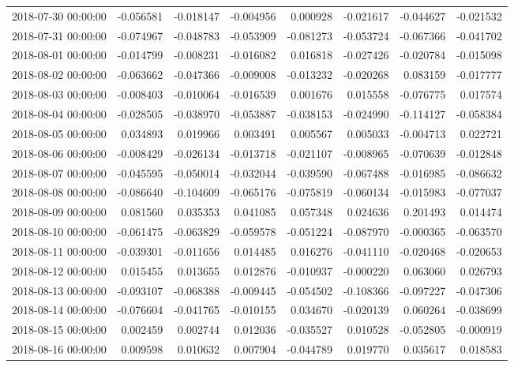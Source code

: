 \begin{tabular}{lrrrrrrr}
2018-07-30 00:00:00 & -0.056581 & -0.018147 & -0.004956 & 0.000928 & -0.021617 & -0.044627 & -0.021532 \\
2018-07-31 00:00:00 & -0.074967 & -0.048783 & -0.053909 & -0.081273 & -0.053724 & -0.067366 & -0.041702 \\
2018-08-01 00:00:00 & -0.014799 & -0.008231 & -0.016082 & 0.016818 & -0.027426 & -0.020784 & -0.015098 \\
2018-08-02 00:00:00 & -0.063662 & -0.047366 & -0.009008 & -0.013232 & -0.020268 & 0.083159 & -0.017777 \\
2018-08-03 00:00:00 & -0.008403 & -0.010064 & -0.016539 & 0.001676 & 0.015558 & -0.076775 & 0.017574 \\
2018-08-04 00:00:00 & -0.028505 & -0.038970 & -0.053887 & -0.038153 & -0.024990 & -0.114127 & -0.058384 \\
2018-08-05 00:00:00 & 0.034893 & 0.019966 & 0.003491 & 0.005567 & 0.005033 & -0.004713 & 0.022721 \\
2018-08-06 00:00:00 & -0.008429 & -0.026134 & -0.013718 & -0.021107 & -0.008965 & -0.070639 & -0.012848 \\
2018-08-07 00:00:00 & -0.045595 & -0.050014 & -0.032044 & -0.039590 & -0.067488 & -0.016985 & -0.086632 \\
2018-08-08 00:00:00 & -0.086640 & -0.104609 & -0.065176 & -0.075819 & -0.060134 & -0.015983 & -0.077037 \\
2018-08-09 00:00:00 & 0.081560 & 0.035353 & 0.041085 & 0.057348 & 0.024636 & 0.201493 & 0.014474 \\
2018-08-10 00:00:00 & -0.061475 & -0.063829 & -0.059578 & -0.051224 & -0.087970 & -0.000365 & -0.063570 \\
2018-08-11 00:00:00 & -0.039301 & -0.011656 & 0.014485 & 0.016276 & -0.041110 & -0.020468 & -0.020653 \\
2018-08-12 00:00:00 & 0.015455 & 0.013655 & 0.012876 & -0.010937 & -0.000220 & 0.063060 & 0.026793 \\
2018-08-13 00:00:00 & -0.093107 & -0.068388 & -0.009445 & -0.054502 & -0.108366 & -0.097227 & -0.047306 \\
2018-08-14 00:00:00 & -0.076604 & -0.041765 & -0.010155 & 0.034670 & -0.020139 & 0.060264 & -0.038699 \\
2018-08-15 00:00:00 & 0.002459 & 0.002744 & 0.012036 & -0.035527 & 0.010528 & -0.052805 & -0.000919 \\
2018-08-16 00:00:00 & 0.009598 & 0.010632 & 0.007904 & -0.044789 & 0.019770 & 0.035617 & 0.018583 \\

\end{tabular}
